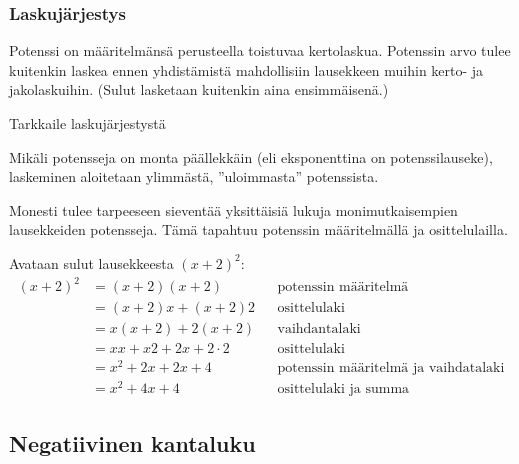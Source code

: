 \subsubsection*{Laskujärjestys} %

Potenssi on määritelmänsä perusteella toistuvaa kertolaskua. Potenssin arvo tulee kuitenkin laskea ennen yhdistämistä mahdollisiin lausekkeen muihin kerto- ja jakolaskuihin. (Sulut lasketaan kuitenkin aina ensimmäisenä.)

    \begin{esimerkki}
      Tarkkaile laskujärjestystä
    \end{esimerkki}  

Mikäli potensseja on monta päällekkäin (eli eksponenttina on potenssilauseke), laskeminen aloitetaan ylimmästä, ''uloimmasta'' potenssista.

\begin{esimerkki}
\end{esimerkki}

Monesti tulee tarpeeseen sieventää yksittäisiä lukuja monimutkaisempien lausekkeiden potensseja. Tämä tapahtuu potenssin määritelmällä ja osittelulailla.
\begin{esimerkki}
 Avataan sulut lausekkeesta $(x+2)^2$:
	\begin{align*}
	(x+2)^2
	&=(x+2)(x+2) && \text{potenssin määritelmä} \\
	&=(x+2)x+(x+2)2 && \text{osittelulaki} \\
	&=x(x+2)+2(x+2) && \text{vaihdantalaki} \\
	&=xx+x2+2x+2\cdot2 && \text{osittelulaki} \\
	&=x^2+2x+2x+4 && \text{potenssin määritelmä ja vaihdatalaki} \\
	&=x^2+4x+4 && \text{osittelulaki ja summa}
	\end{align*}
	
\end{esimerkki} %

\subsection{Negatiivinen kantaluku}

